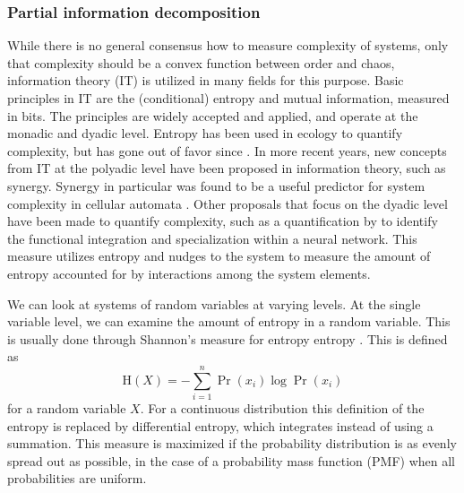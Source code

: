 \documentclass[../main.tex]{subfiles}
\begin{document}
\subsubsection{Partial information decomposition}

While there is no general consensus how to measure complexity of systems, only that complexity should be a convex function between order and chaos, information theory (IT) is utilized in many fields for this purpose\cite{williams2010nonnegative, bar2013computationally}. %
Basic principles in IT are the (conditional) entropy and mutual information, measured in bits.
The principles are widely accepted and applied, and operate at the monadic and dyadic level.
Entropy has been used in ecology to quantify complexity, but has gone out of favor since \cite{ulanowicz2001information}.
In more recent years, new concepts from IT at the polyadic level have been proposed in information theory, such as synergy.
Synergy in particular was found to be a useful predictor for system complexity in cellular automata \cite{9999QuaxChli}.
Other proposals that focus on the dyadic level have been made to quantify complexity, such as a quantification by \cite{tononi1999measures} to identify the functional integration and specialization within a neural network.
This measure utilizes entropy and nudges to the system to measure the amount of entropy accounted for by interactions among the system elements.


We can look at systems of random variables at varying levels.
At the single variable level, we can examine the amount of entropy in a random variable.
This is usually done through Shannon's measure for entropy entropy \cite{shannon1949mathematical}.
This is defined as 
%
\begin{equation}
\mathrm{H}\left( X \right) = -\sum^n_{i=1} \Pr \left( x_i \right ) \log \Pr \left( x_i \right)
\end{equation}
%
for a random variable $X$.
For a continuous distribution this definition of the entropy is replaced by differential entropy, which integrates instead of using a summation.
This measure is maximized if the probability distribution is as evenly spread out as possible, in the case of a probability mass function (PMF) when all probabilities are uniform.
\end{document}
